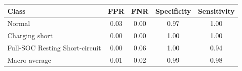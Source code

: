 \begin{tabular}{lcccc}
\hline
Class & FPR & FNR & Specificity & Sensitivity \\
\hline
Normal & 0.03 & 0.00 & 0.97 & 1.00 \\
Charging short & 0.00 & 0.00 & 1.00 & 1.00 \\
Full-SOC Resting Short-circuit & 0.00 & 0.06 & 1.00 & 0.94 \\
Macro average & 0.01 & 0.02 & 0.99 & 0.98 \\
\hline
\end{tabular}
